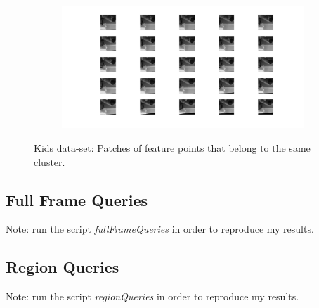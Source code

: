 \documentclass{paper}
\begin{document}
\begin{figure}[H]
\centering
\begin{subfigure}{1.0\textwidth}
\includegraphics[width=\textwidth]{figures/vocabulary/kids/voca1302}
\end{subfigure}
\caption{Kids data-set: Patches of feature points that belong to the same cluster.}
\label{fig:kids_word_2}
\end{figure}

\subsection{Full Frame Queries}
Note: run the script \emph{fullFrameQueries} in order to reproduce my results. \\

\subsection{Region Queries}
Note: run the script \emph{regionQueries} in order to reproduce my results. \\
\end{document}
